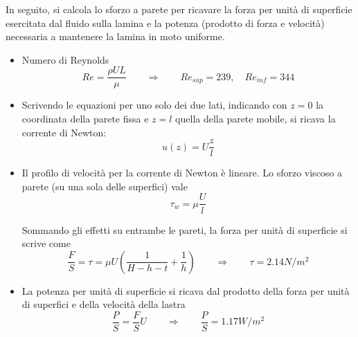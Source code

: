 In seguito, si calcola lo sforzo a parete per ricavare la forza per unità di superficie esercitata
dal fluido sulla lamina e la potenza (prodotto di forza e velocità) necessaria a mantenere la 
lamina in moto uniforme.

\begin{itemize}

\item Numero di Reynolds
 \begin{equation}
   Re = \frac{\rho U L}{\mu}  \qquad \Rightarrow \qquad Re_{sup} = 239 , \quad Re_{inf} = 344
 \end{equation}

\item Scrivendo le equazioni per uno solo dei due lati, indicando con $z=0$ la coordinata della parete fissa
e $z=l$ quella della parete mobile, si ricava la corrente di Newton:
\begin{equation}
  u(z) = U \frac{z}{l}
\end{equation}

\item Il profilo di velocità per la corrente di Newton è lineare. Lo sforzo viscoso a parete (su una sola delle superfici)
vale 
\begin{equation}
  \tau_w = \mu \frac{U}{l}
\end{equation}

Sommando gli effetti su entrambe le pareti, la forza per unità di superficie si scrive come
\begin{equation}
  \frac{F}{S} = \tau = \mu U \displaystyle\left( \frac{1}{H-h-t} + \frac{1}{h} \right)
   \qquad \Rightarrow \qquad \tau = 2.14 N/m^2
\end{equation}

\item La potenza per unità di superficie si ricava dal prodotto della forza per unità di superfici
 e della velocità della lastra
\begin{equation}
  \frac{P}{S} = \frac{F}{S} U \qquad \Rightarrow \qquad \frac{P}{S} = 1.17 W/m^2
\end{equation}


\end{itemize}


